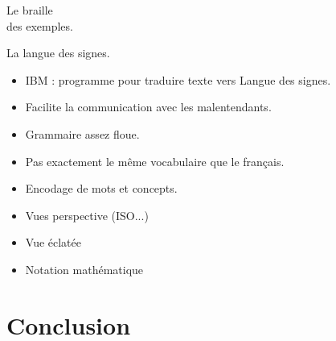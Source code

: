 \documentclass{beamer}
\begin{document}
\begin{frame}  
  \Huge Le braille
  \\ des exemples.
\end{frame}


\begin{frame}  
  { \Huge La langue des signes. }
  \begin{itemize}
  \item IBM : programme pour traduire texte vers Langue des signes.
  \item Facilite la communication avec les malentendants.
  \item Grammaire assez floue.
  \item Pas exactement le même vocabulaire que le français.
  \item Encodage de mots et concepts.
  \end{itemize}
\end{frame}

\begin{frame}  
  \begin{itemize}
  \item Vues perspective (ISO...) %
  \item Vue éclatée
  \item Notation mathématique
  \end{itemize}
\end{frame}

\section{Conclusion}


\begin{frame}
\end{frame}
\end{document}
